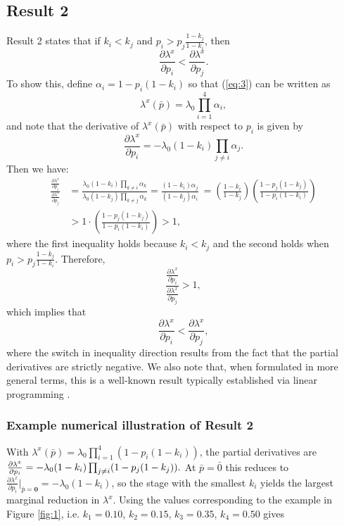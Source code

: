 \documentclass[onecolumn]{article}
\begin{document}
\subsection*{Result 2}
Result 2 states that if $k_i < k_j$ and $p_i > p_j \frac{1 - k_j}{1 - k_i}$, then
\begin{equation} \frac{\partial \lambda^x}{\partial p_i} < \frac{\partial \lambda^x}{\partial p_j}. \end{equation}
To show this, define $\alpha_i = 1 - p_i(1 - k_i)$ so that (\ref{eq:3}) can be written as
\begin{equation} \lambda^x(\bar{p}) = \lambda_0 \prod_{i=1}^4 \alpha_i, \end{equation}
and note that the derivative of $\lambda^x(\bar{p})$ with respect to $p_i$ is given by
\begin{equation} \frac{\partial \lambda^x}{\partial p_i} = -\lambda_0 (1 - k_i) \prod_{j \neq i} \alpha_j. \end{equation}   
Then we have:
\begin{align} \frac{\frac{\partial \lambda^x}{\partial p_i}}{\frac{\partial \lambda^x}{\partial p_j}}&= \frac{\lambda_0 (1 - k_i) \prod_{k \neq i} \alpha_k}{\lambda_0 (1 - k_j) \prod_{k \neq j} \alpha_k}
= \frac{(1 - k_i) \alpha_j}{(1 - k_j) \alpha_i} \ = \left( \frac{1 - k_i}{1 - k_j} \right) \left( \frac{1 - p_j(1 - k_j)}{1 - p_i(1 - k_i)} \right)\\
&> 1 \cdot \left( \frac{1 - p_j(1 - k_j)}{1 - p_i(1 - k_i)} \right) > 1, \end{align}
where the first inequality holds because $k_i < k_j$ and the second holds when $p_i > p_j \frac{1 - k_j}{1 - k_i}$. Therefore,
\begin{equation} \frac{\frac{\partial \lambda^x}{\partial p_i}}{\frac{\partial \lambda^x}{\partial p_j}} > 1, \end{equation}
which implies that
\begin{equation} \frac{\partial \lambda^x}{\partial p_i} < \frac{\partial \lambda^x}{\partial p_j}, \end{equation}
where the switch in inequality direction results from the fact that the partial derivatives are strictly negative.
We also note that, when formulated in more general terms, this is a well-known result typically established via linear programming \citep{Dantzig1963}.

\subsubsection*{Example numerical illustration of Result 2}
With $\lambda^x(\bar{p}) = \lambda_0 \prod_{i=1}^4 (1 - p_i(1 - k_i))$, the partial derivatives are
$\frac{\partial \lambda^x}{\partial p_i} = -\lambda_0\\ (1 - k_i) \prod_{j \neq i} (1 - p_j(1 - k_j)).$ At $\bar{p}=\bar{0}$ this reduces to $\frac{\partial\lambda^x}{\partial p_i}\big|_{\bar p=\mathbf{0}}=-\lambda_0(1-k_i)$, so the stage with the smallest $k_i$ yields the largest marginal reduction in $\lambda^x$. Using the values corresponding to the example in Figure \ref{fig:1}, i.e. $k_1=0.10$, $k_2=0.15$, $k_3=0.35$, $k_4=0.50$ gives\\
\end{document}
